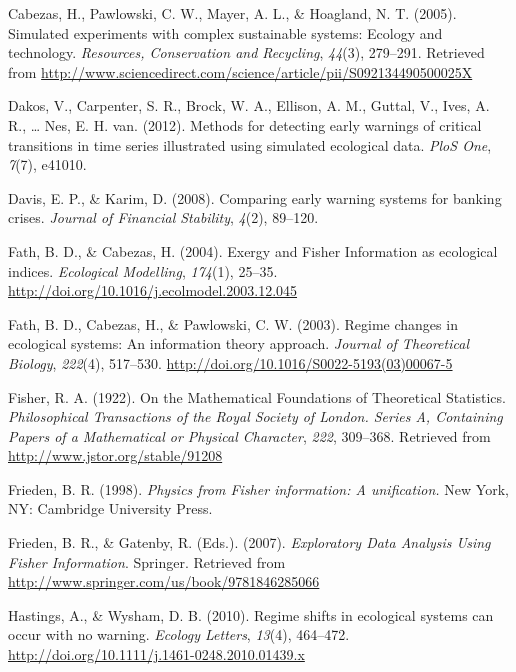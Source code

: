 \documentclass[12pt,twoside]{reedthesis}
\begin{document}
\leavevmode\hypertarget{ref-cabezas_simulated_2005}{}%
Cabezas, H., Pawlowski, C. W., Mayer, A. L., \& Hoagland, N. T. (2005). Simulated experiments with complex sustainable systems: Ecology and technology. \emph{Resources, Conservation and Recycling}, \emph{44}(3), 279--291. Retrieved from \url{http://www.sciencedirect.com/science/article/pii/S092134490500025X}

\leavevmode\hypertarget{ref-dakos_methods_2012}{}%
Dakos, V., Carpenter, S. R., Brock, W. A., Ellison, A. M., Guttal, V., Ives, A. R., \ldots{} Nes, E. H. van. (2012). Methods for detecting early warnings of critical transitions in time series illustrated using simulated ecological data. \emph{PloS One}, \emph{7}(7), e41010.

\leavevmode\hypertarget{ref-davis_comparing_2008}{}%
Davis, E. P., \& Karim, D. (2008). Comparing early warning systems for banking crises. \emph{Journal of Financial Stability}, \emph{4}(2), 89--120.

\leavevmode\hypertarget{ref-fath_exergy_2004}{}%
Fath, B. D., \& Cabezas, H. (2004). Exergy and Fisher Information as ecological indices. \emph{Ecological Modelling}, \emph{174}(1), 25--35. \url{http://doi.org/10.1016/j.ecolmodel.2003.12.045}

\leavevmode\hypertarget{ref-fath_regime_2003}{}%
Fath, B. D., Cabezas, H., \& Pawlowski, C. W. (2003). Regime changes in ecological systems: An information theory approach. \emph{Journal of Theoretical Biology}, \emph{222}(4), 517--530. \url{http://doi.org/10.1016/S0022-5193(03)00067-5}

\leavevmode\hypertarget{ref-fisher_mathematical_1922}{}%
Fisher, R. A. (1922). On the Mathematical Foundations of Theoretical Statistics. \emph{Philosophical Transactions of the Royal Society of London. Series A, Containing Papers of a Mathematical or Physical Character}, \emph{222}, 309--368. Retrieved from \url{http://www.jstor.org/stable/91208}

\leavevmode\hypertarget{ref-frieden_physics_1998}{}%
Frieden, B. R. (1998). \emph{Physics from Fisher information: A unification.} New York, NY: Cambridge University Press.

\leavevmode\hypertarget{ref-frieden_exploratory_2007}{}%
Frieden, B. R., \& Gatenby, R. (Eds.). (2007). \emph{Exploratory Data Analysis Using Fisher Information}. Springer. Retrieved from \url{http://www.springer.com/us/book/9781846285066}

\leavevmode\hypertarget{ref-hastings_regime_2010}{}%
Hastings, A., \& Wysham, D. B. (2010). Regime shifts in ecological systems can occur with no warning. \emph{Ecology Letters}, \emph{13}(4), 464--472. \url{http://doi.org/10.1111/j.1461-0248.2010.01439.x}
\end{document}
